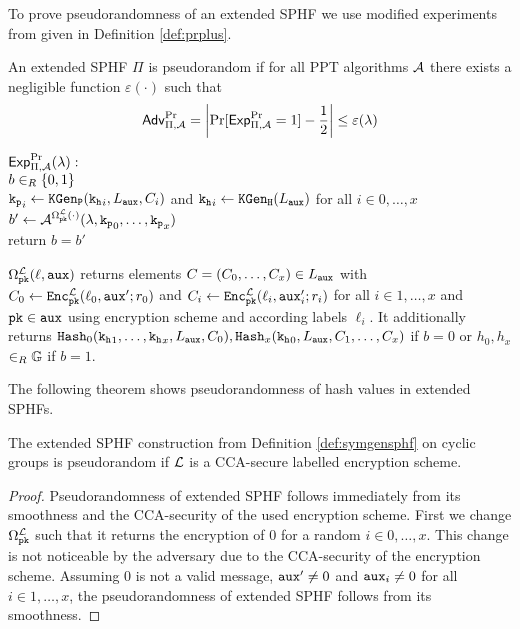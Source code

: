 \noindent
To prove pseudorandomness of an extended \ac{SPHF} we use modified experiments from \cite{Gennaro2003} given in Definition \ref{def:prplus}.

\begin{definition}\label{def:prplus}
An extended \ac{SPHF} $\Pi$ is pseudorandom if for all \ac{PPT} algorithms $\mathcal{A}$ there exists a negligible function $\varepsilon(\cdot)$ such that
\[\mathsf{Adv}_{\Pi,\mathcal{A}}^{\Pr}=\left|\Pr[\mathsf{Exp}_{\Pi,\mathcal{A}}^{\Pr}=1] - \frac12 \right|\leq \varepsilon(\lambda)\]

\noindent
$\mathsf{Exp}_{\Pi,\mathcal{A}}^{\Pr}(\lambda):$ \\
\hspace*{2em} $b\in_R\{0,1\}$\\
\hspace*{2em} $\mathtt{k_p}_i\gets\mathtt{KGen_P}(\mathtt{k_h}_i,L_\mathtt{aux},C_i)$ and $\mathtt{k_h}_i\gets\mathtt{KGen_H}(L_\mathtt{aux})$ for all $i\in 0,\dots,x$\\
\hspace*{2em} $b'\gets\mathcal{A}^{\Omega^{\mathcal{L}}_\mathtt{pk}(\cdot)}(\lambda,\mathtt{k_p}_0,\dots,\mathtt{k_p}_x)$ \\
\hspace*{2em} return $b=b'$

\begin{description}
	\item $\Omega^{\mathcal{L}}_\mathtt{pk}(\ell,\mathtt{aux})$ returns elements $C=(C_0,\dots,C_x)\in L_\mathtt{aux}$ with $C_0\gets\mathtt{Enc}^\mathcal{L}_\mathtt{pk}(\ell_0,\allowbreak\mathtt{aux}';r_0)$ and $C_i\gets\mathtt{Enc}^\mathcal{L}_\mathtt{pk}\allowbreak(\ell_i,\mathtt{aux}'_i;r_i)$ for all $i\in1,\dots,x$ and $\mathtt{pk}\in\mathtt{aux}$ using encryption scheme \cL and according labels $\ell_i$.
	It additionally returns $\mathtt{Hash}_0(\mathtt{k_h}_1,\dots,\allowbreak\mathtt{k_h}_x,L_\mathtt{aux},C_0),\mathtt{Hash}_x(\mathtt{k_h}_0,\allowbreak L_\mathtt{aux},C_1,\dots,C_x)$ if $b=0$ or $h_0,h_x$ $\in_R\mathbb{G}$ if $b=1$. \eod
\end{description}
\end{definition}

\noindent
The following theorem shows pseudorandomness of hash values in extended \acp{SPHF}.

\begin{theorem}\label{theo:prsphff}
The extended \ac{SPHF} construction from Definition \ref{def:symgensphf} on cyclic groups is pseudorandom if $\mathcal{L}$ is a \ac{CCA}-secure labelled encryption scheme.
\end{theorem}

\begin{proof}
Pseudorandomness of extended \ac{SPHF} follows immediately from its smoothness and the \ac{CCA}-security of the used encryption scheme.
First we change $\Omega^\mathcal{L}_\mathtt{pk}$ such that it returns the encryption of $0$ for a random $i\in0,\dots,x$.
This change is not noticeable by the adversary due to the \ac{CCA}-security of the encryption scheme.
Assuming $0$ is not a valid message, \ie $\mathtt{aux}'\not=0$ and $\mathtt{aux}_i\not=0$ for all $i\in1,\dots,x$, the pseudorandomness of extended \ac{SPHF} follows from its smoothness.
\end{proof}

